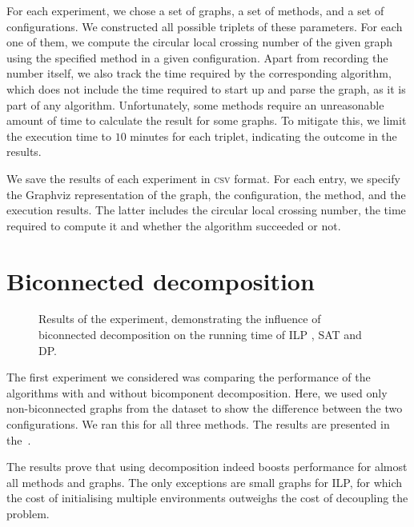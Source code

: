 For each experiment, we chose a set of graphs, a set of methods, and a set of configurations. We constructed all possible triplets of these parameters. For each one of them, we compute the circular local crossing number of the given graph using the specified method in a given configuration. Apart from recording the number itself, we also track the time required by the corresponding algorithm, which does not include the time required to start up and parse the graph, as it is part of any algorithm. Unfortunately, some methods require an unreasonable amount of time to calculate the result for some graphs. To mitigate this, we limit the execution time to \(10\) minutes for each triplet, indicating the outcome in the results.

We save the results of each experiment in \textsc{csv} format. For each entry, we specify the Graphviz representation of the graph, the configuration, the method, and the execution results. The latter includes the circular local crossing number, the time required to compute it and whether the algorithm succeeded or not.


\section{Biconnected decomposition}

\begin{figure}[tbh]
    \centering
     \hfill
     \hfill
    \caption{Results of the experiment, demonstrating the influence of biconnected decomposition on the running time of \textsf{ILP} , \textsf{SAT} and \textsf{DP}.}
    \label{fig:bctree-results}
\end{figure}

The first experiment we considered was comparing the performance of the algorithms with and without bicomponent decomposition. Here, we used only non-biconnected graphs from the dataset to show the difference between the two configurations. We ran this for all three methods. The results are presented in the~.

The results prove that using decomposition indeed boosts performance for almost all methods and graphs. The only exceptions are small graphs for \textsf{ILP}, for which the cost of initialising multiple environments outweighs the cost of decoupling the problem.

